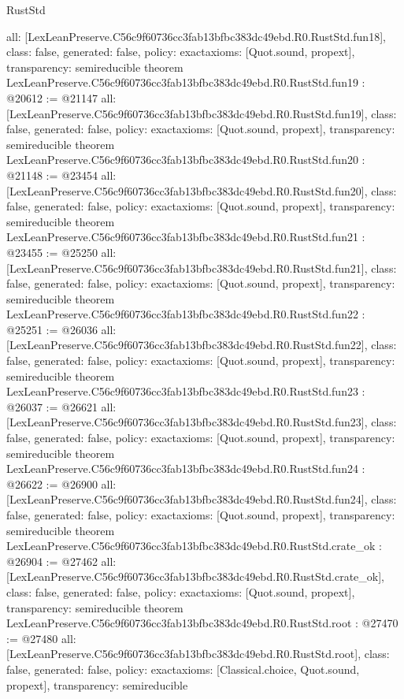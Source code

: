 \begin{lexlean}{RustStd}
\begin{coremodule}
{  all: [LexLeanPreserve.C56c9f60736cc3fab13bfbc383dc49ebd.R0.RustStd.fun18],
  class: false,
  generated: false,
  policy: exact{axioms: [Quot.sound, propext]},
  transparency: semireducible
}
theorem LexLeanPreserve.C56c9f60736cc3fab13bfbc383dc49ebd.R0.RustStd.fun19 : @20612 := @21147 {
  all: [LexLeanPreserve.C56c9f60736cc3fab13bfbc383dc49ebd.R0.RustStd.fun19],
  class: false,
  generated: false,
  policy: exact{axioms: [Quot.sound, propext]},
  transparency: semireducible
}
theorem LexLeanPreserve.C56c9f60736cc3fab13bfbc383dc49ebd.R0.RustStd.fun20 : @21148 := @23454 {
  all: [LexLeanPreserve.C56c9f60736cc3fab13bfbc383dc49ebd.R0.RustStd.fun20],
  class: false,
  generated: false,
  policy: exact{axioms: [Quot.sound, propext]},
  transparency: semireducible
}
theorem LexLeanPreserve.C56c9f60736cc3fab13bfbc383dc49ebd.R0.RustStd.fun21 : @23455 := @25250 {
  all: [LexLeanPreserve.C56c9f60736cc3fab13bfbc383dc49ebd.R0.RustStd.fun21],
  class: false,
  generated: false,
  policy: exact{axioms: [Quot.sound, propext]},
  transparency: semireducible
}
theorem LexLeanPreserve.C56c9f60736cc3fab13bfbc383dc49ebd.R0.RustStd.fun22 : @25251 := @26036 {
  all: [LexLeanPreserve.C56c9f60736cc3fab13bfbc383dc49ebd.R0.RustStd.fun22],
  class: false,
  generated: false,
  policy: exact{axioms: [Quot.sound, propext]},
  transparency: semireducible
}
theorem LexLeanPreserve.C56c9f60736cc3fab13bfbc383dc49ebd.R0.RustStd.fun23 : @26037 := @26621 {
  all: [LexLeanPreserve.C56c9f60736cc3fab13bfbc383dc49ebd.R0.RustStd.fun23],
  class: false,
  generated: false,
  policy: exact{axioms: [Quot.sound, propext]},
  transparency: semireducible
}
theorem LexLeanPreserve.C56c9f60736cc3fab13bfbc383dc49ebd.R0.RustStd.fun24 : @26622 := @26900 {
  all: [LexLeanPreserve.C56c9f60736cc3fab13bfbc383dc49ebd.R0.RustStd.fun24],
  class: false,
  generated: false,
  policy: exact{axioms: [Quot.sound, propext]},
  transparency: semireducible
}
theorem LexLeanPreserve.C56c9f60736cc3fab13bfbc383dc49ebd.R0.RustStd.crate_ok : @26904 := @27462 {
  all: [LexLeanPreserve.C56c9f60736cc3fab13bfbc383dc49ebd.R0.RustStd.crate_ok],
  class: false,
  generated: false,
  policy: exact{axioms: [Quot.sound, propext]},
  transparency: semireducible
}
theorem LexLeanPreserve.C56c9f60736cc3fab13bfbc383dc49ebd.R0.RustStd.root : @27470 := @27480 {
  all: [LexLeanPreserve.C56c9f60736cc3fab13bfbc383dc49ebd.R0.RustStd.root],
  class: false,
  generated: false,
  policy: exact{axioms: [Classical.choice, Quot.sound, propext]},
  transparency: semireducible
}


\end{coremodule}
\end{lexlean}

